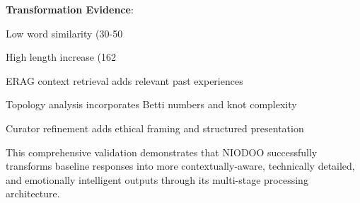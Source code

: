 \documentclass[11pt,a4paper]{article}
\begin{document}
\textbf{Transformation Evidence}:
\item Low word similarity (30-50%
\item High length increase (162%
\item ERAG context retrieval adds relevant past experiences
\item Topology analysis incorporates Betti numbers and knot complexity
\item Curator refinement adds ethical framing and structured presentation

This comprehensive validation demonstrates that NIODOO successfully transforms baseline responses into more contextually-aware, technically detailed, and emotionally intelligent outputs through its multi-stage processing architecture.
\end{document}
